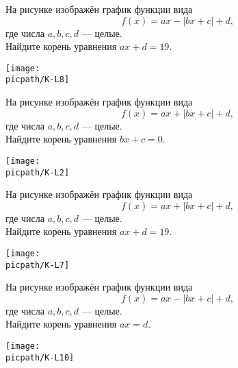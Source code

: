 \begin{class}[number=2]
	\begin{listofex}
		\item
		\begin{minipage}[t]{\bodywidth}
			На рисунке изображён график функции вида \[ f(x)=ax-|bx+c|+d, \] где числа \(a, b, c, d\) --- целые.\\ Найдите корень уравнения \(ax+d=19\).
		\end{minipage}
		\hspace{0.02\linewidth}
		\begin{minipage}[t]{\picwidth}
			\texttt{[image: \\picpath/K-L8]}
		\end{minipage}
		\item
		\begin{minipage}[t]{\bodywidth}
			На рисунке изображён график функции вида \[ f(x)=ax+|bx+c|+d, \] где числа \(a, b, c, d\) --- целые.\\ Найдите корень уравнения \(bx+c=0\).
		\end{minipage}
		\hspace{0.02\linewidth}
		\begin{minipage}[t]{\picwidth}
			\texttt{[image: \\picpath/K-L2]}
		\end{minipage}
		\item
		\begin{minipage}[t]{\bodywidth}
			На рисунке изображён график функции вида \[ f(x)=ax+|bx+c|+d, \] где числа \(a, b, c, d\) --- целые.\\ Найдите корень уравнения \(ax+d=19\).
		\end{minipage}
		\hspace{0.02\linewidth}
		\begin{minipage}[t]{\picwidth}
			\texttt{[image: \\picpath/K-L7]}
		\end{minipage}
		\item
		\begin{minipage}[t]{\bodywidth}
			На рисунке изображён график функции вида \[ f(x)=ax-|bx+c|+d, \] где числа \(a, b, c, d\) --- целые.\\ Найдите корень уравнения \(ax=d\).
		\end{minipage}
		\hspace{0.02\linewidth}
		\begin{minipage}[t]{\picwidth}
			\texttt{[image: \\picpath/K-L10]}
		\end{minipage}
	\end{listofex}
\end{class}

